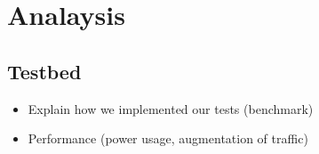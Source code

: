 \part{Analaysis}  \label{part:analysis}

\chapter{Testbed}

\begin{itemize}
	\item Explain how we implemented our tests (benchmark)
	\item Performance (power usage, augmentation of traffic)
\end{itemize}
